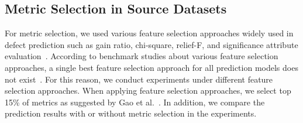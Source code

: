 % 

\subsection{Metric Selection in Source Datasets}
\label{sec:metricselection}
For metric selection, we used various feature selection
approaches widely used in defect prediction such as gain ratio, chi-square,
relief-F, and significance attribute evaluation~\cite{Gao11,Shivaji13}.
According to benchmark studies about various feature selection approaches, a
single best feature selection approach for all prediction models does not
exist~\cite{Catal09,Hall03,Liu02}. For this reason, we conduct experiments
under different feature selection approaches. When applying feature selection
approaches, we select top 15\% of metrics as suggested by Gao et
al.~\cite{Gao11}. In addition, we compare the prediction results with or without
metric selection in the experiments.





